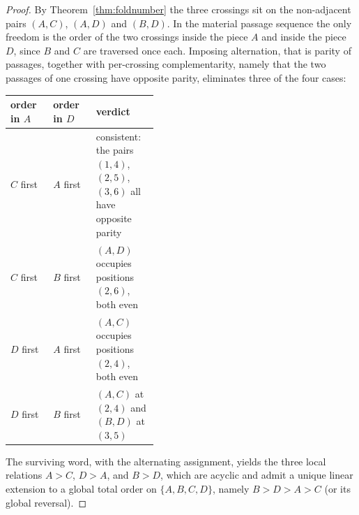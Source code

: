 \begin{proof}
By Theorem~\ref{thm:foldnumber} the three crossings sit on the non-adjacent pairs $(A,C)$, $(A,D)$ and $(B,D)$. In the material passage sequence the only freedom is the order of the two crossings inside the piece $A$ and inside the piece $D$, since $B$ and $C$ are traversed once each. Imposing alternation, that is parity of passages, together with per-crossing complementarity, namely that the two passages of one crossing have opposite parity, eliminates three of the four cases:
\begin{center}
\small
\begin{tabular}{llp{0.42\linewidth}}
\hline
order in $A$ & order in $D$ & verdict\tabularnewline
\hline
$C$ first & $A$ first & \raggedright consistent: the pairs $(1,4)$, $(2,5)$, $(3,6)$ all have opposite parity\tabularnewline
$C$ first & $B$ first & \raggedright $(A,D)$ occupies positions $(2,6)$, both even\tabularnewline
$D$ first & $A$ first & \raggedright $(A,C)$ occupies positions $(2,4)$, both even\tabularnewline
$D$ first & $B$ first & \raggedright $(A,C)$ at $(2,4)$ and $(B,D)$ at $(3,5)$\tabularnewline
\hline
\end{tabular}
\end{center}
The surviving word, with the alternating assignment, yields the three local relations $A>C$, $D>A$, and $B>D$, which are acyclic and admit a unique linear extension to a global total order on $\{A,B,C,D\}$, namely $B>D>A>C$ (or its global reversal).
\end{proof}

